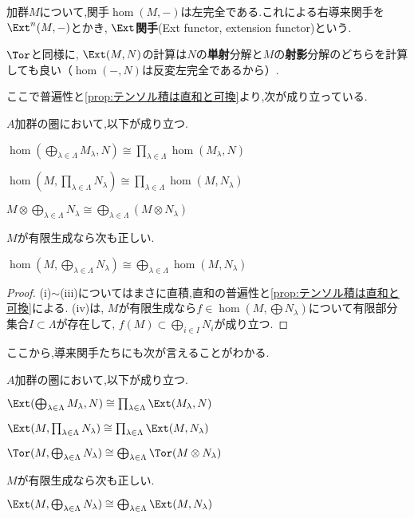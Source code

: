 \begin{defi}[$\Ext$関手]
	加群$M$について,関手$\hom(M,-)$は左完全である.これによる右導来関手を$\Ext^n(M,-)$とかき, $\Ext$\textbf{関手}(Ext functor, extension functor)という.
\end{defi}

$\Tor$と同様に, $\Ext(M,N)$の計算は$N$の\textbf{単射}分解と$M$の\textbf{射影}分解のどちらを計算しても良い（$\hom(-,N)$は反変左完全であるから）.

ここで普遍性と\ref{prop:テンソル積は直和と可換}より,次が成り立っている.

\begin{prop}
	$A$加群の圏において,以下が成り立つ.
	\begin{sakura}
		\item $\hom(\bigoplus_{\lambda\in\Lambda} M_\lambda,N)\cong\prod_{\lambda\in\Lambda}\hom(M_\lambda,N)$
		\item $\hom(M,\prod_{\lambda\in\Lambda}N_\lambda)\cong\prod_{\lambda\in\Lambda}\hom(M,N_\lambda)$
		\item $M\otimes\bigoplus_{\lambda\in\Lambda}N_\lambda\cong\bigoplus_{\lambda\in\Lambda}(M\otimes N_\lambda)$
	\end{sakura}
	$M$が有限生成なら次も正しい.
	\begin{sakura}\setcounter{enumi}{3}
		\item $\hom(M,\bigoplus_{\lambda\in\Lambda}N_\lambda)\cong\bigoplus_{\lambda\in\Lambda}\hom(M,N_\lambda)$
	\end{sakura}
\end{prop}

\begin{proof}
	(i)$\sim$(iii)についてはまさに直積,直和の普遍性と\ref{prop:テンソル積は直和と可換}による. (iv)は, $M$が有限生成なら$f\in\hom(M,\bigoplus N_\lambda)$について有限部分集合$I\subset\Lambda$が存在して, $f(M)\subset\bigoplus_{i\in I} N_i$が成り立つ.
\end{proof}

ここから,導来関手たちにも次が言えることがわかる.

\begin{prop}\label{prop:Tor,Extと直和,直積}
	$A$加群の圏において,以下が成り立つ.
	\begin{sakura}
		\item $\Ext(\bigoplus_{\lambda\in\Lambda} M_\lambda,N)\cong\prod_{\lambda\in\Lambda}\Ext(M_\lambda,N)$
		\item $\Ext(M,\prod_{\lambda\in\Lambda}N_\lambda)\cong\prod_{\lambda\in\Lambda}\Ext(M,N_\lambda)$
		\item $\Tor(M,\bigoplus_{\lambda\in\Lambda}N_\lambda)\cong\bigoplus_{\lambda\in\Lambda}\Tor(M\otimes N_\lambda)$
	\end{sakura}
	$M$が有限生成なら次も正しい.
	\begin{sakura}\setcounter{enumi}{3}
		\item $\Ext(M,\bigoplus_{\lambda\in\Lambda}N_\lambda)\cong\bigoplus_{\lambda\in\Lambda}\Ext(M,N_\lambda)$
	\end{sakura}
\end{prop}

